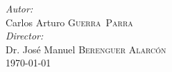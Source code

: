 \begin{titlepage}

\emph{Autor:}\\
Carlos Arturo \textsc{Guerra~Parra} %
\\[1cm]
\emph{Director:} \\
Dr. José Manuel \textsc{Berenguer Alarcón} %
\\[2cm]



{\large \today} %


 

\vfill %

\end{titlepage}